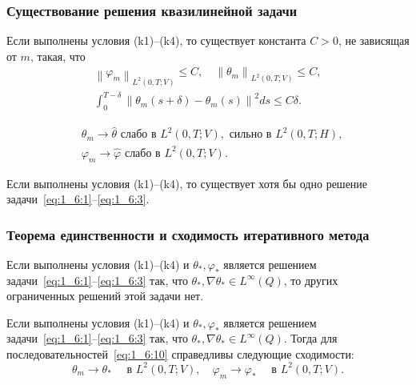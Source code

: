 \begin{frame}
    \frametitle{Существование решения квазилинейной задачи}
    \begin{lemma}
        \label{lm:1_6:3}
        Если выполнены условия (k1)--(k4), то существует константа $C>0$,
        не зависящая от $m$, такая, что
        \begin{gather*}
            \left\|\varphi_{m}\right\|_{L^{2}(0, T ; V)} \leq C,
            \quad\left\|\theta_{m}\right\|_{L^{2}(0, T ; V)} \leq C, \\
            \int_{0}^{T-\delta}\left\|\theta_{m}(s+\delta)
            -\theta_{m}(s)\right\|^{2} d s \leq C \delta.
        \end{gather*}
    \end{lemma}

    \begin{equation*}
        \begin{aligned}
            & \theta_{m} \rightarrow \widehat{\theta} \text { слабо в } L^{2}(0, T ; V),
            \text { сильно в } L^{2}(0, T ; H), \\
            & \varphi_{m} \rightarrow \widehat{\varphi} \text { слабо в } L^{2}(0, T ; V).
        \end{aligned}
    \end{equation*}

    \begin{theorem}
        \label{th:1_6:1}
        Если выполнены условия (k1)--(k4), то существует хотя бы одно
        решение задачи~\eqref{eq:1_6:1}--\eqref{eq:1_6:3}.
    \end{theorem}

\end{frame}

\begin{frame}
    \frametitle{Теорема единственности и сходимость итеративного метода}
    \begin{theorem}
        Если выполнены условия (k1)--(k4) и $\theta_{*}, \varphi_{*}$ является
        решением задачи~\eqref{eq:1_6:1}--\eqref{eq:1_6:3}
        так, что $\theta_{*}, \nabla \theta_{*} \in L^{\infty}(Q)$,
        то других ограниченных решений этой задачи нет.
    \end{theorem}


    \begin{theorem}
        Если выполнены условия (k1)--(k4) и $\theta_{*}, \varphi_{*}$ является
        решением задачи~\eqref{eq:1_6:1}--\eqref{eq:1_6:3}
        так, что $\theta_{*}, \nabla \theta_{*} \in L^{\infty}(Q)$.
        Тогда для последовательностей~\eqref{eq:1_6:10} справедливы следующие сходимости:
        \[
            \theta_{m} \rightarrow \theta_{*} \quad \text { в } L^{2}(0, T ; V),
            \quad \varphi_{m} \rightarrow \varphi_{*} \quad \text { в } L^{2}(0, T ; V).
        \]
    \end{theorem}

\end{frame}



